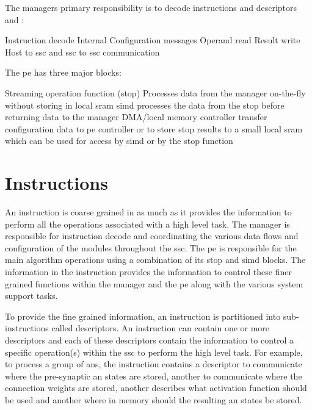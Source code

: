 The managers primary responsibility is to decode instructions and descriptors and :

\begin{outline}
    \1 Instruction decode
    \1 Internal Configuration messages
    \1 Operand read
    \1 Result write
    \1 Host to \ac{ssc} and \ac{ssc} to \ac{ssc} communication
\end{outline}


The \ac{pe} has three major blocks:

\begin{outline}
    \1 Streaming operation function (\ac{stop})
      \2 Processes data from the manager on-the-fly without storing in local \ac{sram}
    \1 \ac{simd}
      \2 processes the data from the \ac{stop} before returning data to the manager
    \1 DMA/local memory controller
      \2 transfer configuration data to \ac{pe} controller or to store \ac{stop} results to a small local \ac{sram} which can be used for access by \ac{simd} or by the \ac{stop} function
\end{outline}

\fi
\section{Instructions}
\label{sec:Instructions}

An instruction is coarse grained in as much as it provides the information to perform all the operations associated with a high level task.
The manager is responsible for instruction decode and coordinating the various data flows and configuration of the modules throughout the \ac{ssc}.
The \ac{pe} is responsible for the main algorithm operations using a combination of its \ac{stop} and \ac{simd} blocks.
The information in the instruction provides the information to control these finer grained functions within the manager and the \ac{pe} along with the various system support tasks.

To provide the fine grained information, an instruction is partitioned into sub-instructions called descriptors.
An instruction can contain one or more descriptors and each of these descriptors contain the information to control a specific operation(s) within the \ac{ssc} to perform the high level task.
For example, to process a group of \acp{an}, the instruction contains a descriptor to communicate where the pre-synaptic \ac{an} states are stored, another to communicate where the connection weights are stored, another describes what activation function should be used and another where in memory should the resulting \ac{an} states be stored.

